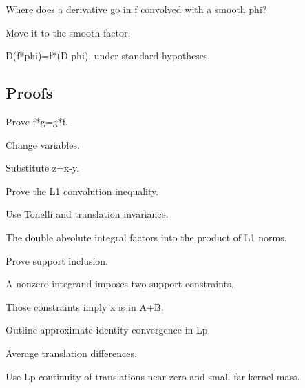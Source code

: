 \begin{exercise}[Derivative]\label{exr:iii10-expand-05}
Where does a derivative go in f convolved with a smooth phi?
\end{exercise}
\begin{hint}
Move it to the smooth factor.
\end{hint}
\begin{solution}
D(f*phi)=f*(D phi), under standard hypotheses.
\end{solution}

\subsection*{Proofs}

\begin{exercise}\label{exr:iii10-expand-06}
Prove f*g=g*f.
\end{exercise}
\begin{hint}
Change variables.
\end{hint}
\begin{solution}
Substitute z=x-y.
\end{solution}

\begin{exercise}\label{exr:iii10-expand-07}
Prove the L1 convolution inequality.
\end{exercise}
\begin{hint}
Use Tonelli and translation invariance.
\end{hint}
\begin{solution}
The double absolute integral factors into the product of L1 norms.
\end{solution}

\begin{exercise}\label{exr:iii10-expand-08}
Prove support inclusion.
\end{exercise}
\begin{hint}
A nonzero integrand imposes two support constraints.
\end{hint}
\begin{solution}
Those constraints imply x is in A+B.
\end{solution}

\begin{exercise}\label{exr:iii10-expand-09}
Outline approximate-identity convergence in Lp.
\end{exercise}
\begin{hint}
Average translation differences.
\end{hint}
\begin{solution}
Use Lp continuity of translations near zero and small far kernel mass.
\end{solution}

